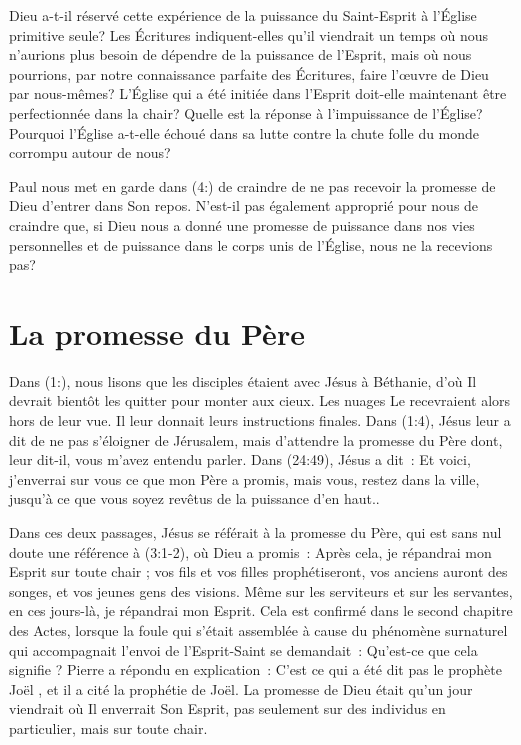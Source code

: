 Dieu a-t-il réservé cette expérience de la puissance du Saint-Esprit à
 l'Église primitive seule? Les Écritures indiquent-elles qu'il viendrait
 un temps où nous n'aurions plus besoin de dépendre de la puissance
 de l'Esprit, mais où nous pourrions, par notre connaissance parfaite
 des Écritures, faire l'œuvre de Dieu par nous-mêmes? L'Église qui a été
 initiée dans l'Esprit doit-elle maintenant être perfectionnée dans
 la chair?
 Quelle est la réponse à l'impuissance de l'Église?
 Pourquoi l'Église a-t-elle échoué dans sa lutte contre la chute folle
 du monde corrompu autour de nous?

Paul nous met en garde dans (4:) de craindre de ne pas
 recevoir la promesse de Dieu d'entrer dans Son repos.
 N'est-il pas également approprié pour nous de craindre que, si Dieu
 nous a donné une promesse de puissance dans nos vies personnelles et de
 puissance dans le corps unis de l'Église, nous ne la recevions pas?


\section*{La promesse du Père}

Dans (1:), nous lisons que les disciples étaient avec
 Jésus à Béthanie, d'où Il devrait bientôt les quitter pour monter
 aux cieux.
 Les nuages Le recevraient alors hors de leur vue.
 Il leur donnait leurs instructions finales.
 Dans (1:4), Jésus leur a dit de \og ne pas s'éloigner
 de Jérusalem, mais d'attendre la promesse du Père dont, leur dit-il,
 vous m'avez entendu parler. \fg{}
 Dans (24:49), Jésus a dit~:
 \og Et voici, j'enverrai sur vous ce que mon Père a promis, mais vous,
 restez dans la ville, jusqu'à ce que vous soyez revêtus de la puissance
 d'en haut.\fg{}.

Dans ces deux passages, Jésus se référait à la promesse du Père, qui est
 sans nul doute une référence à (3:1-2), où Dieu a promis~:
 \og Après cela, je répandrai mon Esprit sur toute chair ;
 vos fils et vos filles prophétiseront, vos anciens auront des songes,
 et vos jeunes gens des visions.
 Même sur les serviteurs et sur les servantes,
 en ces jours-là, je répandrai mon Esprit. \fg{}
 Cela est confirmé dans le second chapitre des Actes, lorsque la foule qui
 s'était assemblée à cause du phénomène surnaturel qui accompagnait l'envoi
 de l'Esprit-Saint se demandait~:
 \og Qu'est-ce que cela signifie ? \fg{}
 Pierre a répondu en explication~:
 \og C'est ce qui a été dit pas le prophète Joël \fg{},
 et il a cité la prophétie de Joël.
 La promesse de Dieu était qu'un jour viendrait où Il enverrait Son Esprit,
 pas seulement sur des individus en particulier, mais sur toute chair.


